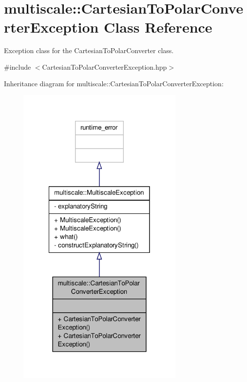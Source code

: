 \hypertarget{classmultiscale_1_1CartesianToPolarConverterException}{\section{multiscale\-:\-:Cartesian\-To\-Polar\-Converter\-Exception Class Reference}
\label{classmultiscale_1_1CartesianToPolarConverterException}
}


Exception class for the Cartesian\-To\-Polar\-Converter class.  




{\ttfamily \#include $<$Cartesian\-To\-Polar\-Converter\-Exception.\-hpp$>$}



Inheritance diagram for multiscale\-:\-:Cartesian\-To\-Polar\-Converter\-Exception\-:\nopagebreak
\begin{figure}[H]
\begin{center}
\leavevmode
\includegraphics[width=234pt]{classmultiscale_1_1CartesianToPolarConverterException__inherit__graph}
\end{center}
\end{figure}



